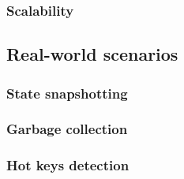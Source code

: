 \subsubsection{Scalability}

\subsection{Real-world scenarios} \label{real-world-scenarios}

\subsubsection{State snapshotting}

\subsubsection{Garbage collection}

\subsubsection{Hot keys detection}





